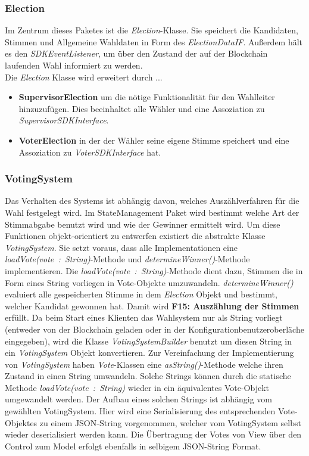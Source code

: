 \documentclass[parskip=full]{scrartcl}
\newcommand{\textitx}[1]{\mbox{\textit{#1}}}
\newcommand{\fakeparagraph}[1]{\textbf{#1}}
\begin{document}
		\subsubsection{Election}
		Im Zentrum dieses Paketes ist die \textitx{Election}-Klasse. Sie speichert die Kandidaten, Stimmen und Allgemeine Wahldaten in Form des \textitx{ElectionDataIF}. Außerdem hält es den \textit{SDKEventListener}, um über den Zustand der auf
		der Blockchain laufenden Wahl informiert zu werden.\\
		Die \textitx{Election} Klasse wird erweitert durch ...
		\begin{itemize}
			\item\fakeparagraph{SupervisorElection} um die nötige Funktionalität für den Wahlleiter hinzuzufügen. Dies beeinhaltet alle Wähler und eine Assoziation zu \textitx{SupervisorSDKInterface}.
			\item\fakeparagraph{VoterElection} in der der Wähler seine eigene Stimme speichert und eine Assoziation zu \textitx{VoterSDKInterface} hat.
		\end{itemize}
		
		\subsubsection{VotingSystem}
		Das Verhalten des Systems ist abhängig davon, welches Auszählverfahren für die Wahl festgelegt wird. Im StateManagement Paket wird bestimmt welche Art der Stimmabgabe benutzt wird und wie der Gewinner ermittelt wird.
		Um diese Funktionen objekt-orientiert zu entwerfen existiert die abstrakte Klasse \textitx{VotingSystem}. Sie setzt voraus, dass alle Implementationen eine \textitx{loadVote(vote : String)}-Methode und \textitx{determineWinner()}-Methode implementieren. Die \textitx{loadVote(vote : String)}-Methode dient dazu, Stimmen die in Form eines String vorliegen in Vote-Objekte umzuwandeln. \textitx{determineWinner()} evaluiert alle gespeicherten Stimme in dem \textitx{Election} Objekt und bestimmt, welcher Kandidat gewonnen hat. Damit wird \textbf{F15: Auszählung der Stimmen} erfüllt.
		Da beim Start eines Klienten das Wahlsystem nur als String vorliegt (entweder von der Blockchain geladen oder in der Konfigurationbenutzeroberläche eingegeben), wird die Klasse \textit{VotingSystemBuilder} benutzt um diesen String in ein \textitx{VotingSystem} Objekt konvertieren.
		Zur Vereinfachung der Implementierung von \textitx{VotingSystem} haben \textitx{Vote}-Klassen eine \textitx{asString()}-Methode welche ihren Zustand in einen String umwandeln. Solche Strings können durch die statische Methode \textitx{loadVote(vote : String)} wieder in ein äquivalentes Vote-Objekt umgewandelt werden. Der Aufbau eines solchen Strings ist abhängig vom gewählten VotingSystem. Hier wird eine Serialisierung des entsprechenden Vote-Objektes zu einem JSON-String vorgenommen, welcher vom VotingSystem selbst wieder deserialisiert werden kann. Die Übertragung der Votes von View über den Control zum Model erfolgt ebenfalls in selbigem JSON-String Format.
	
\end{document}
